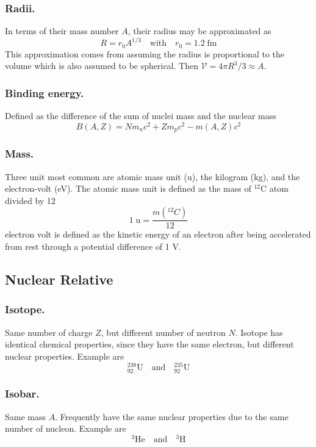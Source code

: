 \documentclass[../../../main.tex]{subfiles}
\begin{document}
\subsubsection*{Radii.} In terms of their mass number $A$, their radius may be approximated as 
\begin{equation*}
    R=r_0A^{1/3}\quad\text{with}\quad r_0=1.2\;\text{fm}
\end{equation*}
This approximation comes from assuming the radius is proportional to the volume which is also assumed to be spherical. Then $\mathcal{V}=4\pi R^3/3\approx A$. 

\subsubsection*{Binding energy.} Defined as the difference of the sum of nuclei mass and the nuclear mass 
\begin{equation*}
    B(A,Z)=Nm_nc^2+Zm_pc^2-m(A,Z)c^2
\end{equation*} 

\subsubsection*{Mass.} Three unit most common are atomic mass unit (u), the kilogram (kg), and the electron-volt (eV). The atomic mass unit is defined as the mass of $^{12}$C atom divided by 12
\begin{equation*}
    1\;\text{u}=\frac{m (^{12}C)}{12}
\end{equation*}
electron volt is defined as the kinetic energy of an electron after being accelerated from rest through a potential diﬀerence of 1 V.

\subsection*{Nuclear Relative}
\subsubsection*{Isotope.} Same number of charge $Z$, but different number of neutron $N$. Isotope has identical chemical properties, since they have the same electron, but different nuclear properties. Example are
\begin{equation*}
    ^{238}_{92}\text{U}\quad\text{and}\quad    ^{235}_{92}\text{U}
\end{equation*}

\subsubsection*{Isobar.} Same mass $A$. Frequently have the same nuclear properties due to the same number of nucleon. Example are
\begin{equation*}
    ^{3}\text{He}\quad\text{and}\quad    ^{3}\text{H}
\end{equation*}
\end{document}

